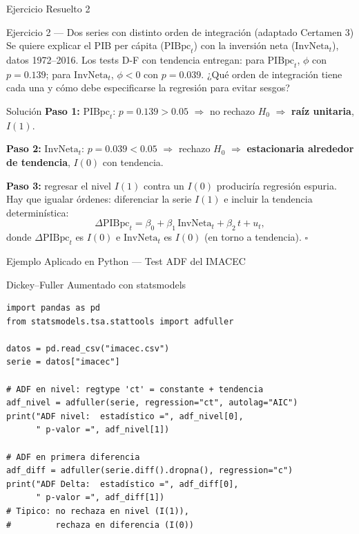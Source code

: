 \documentclass{beamer}
\begin{document}
\begin{frame}{Ejercicio Resuelto 2}

\begin{block}{Ejercicio 2 --- Dos series con distinto orden de integración (adaptado Certamen 3)}
Se quiere explicar el PIB per cápita ($\text{PIBpc}_t$) con la inversión neta ($\text{InvNeta}_t$), datos 1972--2016. Los tests D-F con tendencia entregan: para $\text{PIBpc}_t$, $\phi$ con $p=0.139$; para $\text{InvNeta}_t$, $\phi<0$ con $p=0.039$. ¿Qué orden de integración tiene cada una y cómo debe especificarse la regresión para evitar sesgos?
\end{block}

\pause

\begin{exampleblock}{Solución}
\textbf{Paso 1:} $\text{PIBpc}_t$: $p=0.139>0.05$ $\Rightarrow$ no rechazo $H_0$ $\Rightarrow$ \textbf{raíz unitaria}, $I(1)$.

\textbf{Paso 2:} $\text{InvNeta}_t$: $p=0.039<0.05$ $\Rightarrow$ rechazo $H_0$ $\Rightarrow$ \textbf{estacionaria alrededor de tendencia}, $I(0)$ con tendencia.

\textbf{Paso 3:} regresar el nivel $I(1)$ contra un $I(0)$ produciría regresión espuria. Hay que igualar órdenes: diferenciar la serie $I(1)$ e incluir la tendencia determinística:
\[
\Delta \text{PIBpc}_t = \beta_0 + \beta_1\, \text{InvNeta}_t + \beta_2\, t + u_t,
\]
donde $\Delta \text{PIBpc}_t$ es $I(0)$ e $\text{InvNeta}_t$ es $I(0)$ (en torno a tendencia). \hfill $\square$
\end{exampleblock}

\end{frame}

\begin{frame}[fragile]{Ejemplo Aplicado en Python --- Test ADF del IMACEC}

\begin{exampleblock}{Dickey--Fuller Aumentado con statsmodels}
\begin{verbatim}
import pandas as pd
from statsmodels.tsa.stattools import adfuller

datos = pd.read_csv("imacec.csv")
serie = datos["imacec"]

# ADF en nivel: regtype 'ct' = constante + tendencia
adf_nivel = adfuller(serie, regression="ct", autolag="AIC")
print("ADF nivel:  estadístico =", adf_nivel[0],
      " p-valor =", adf_nivel[1])

# ADF en primera diferencia
adf_diff = adfuller(serie.diff().dropna(), regression="c")
print("ADF Delta:  estadístico =", adf_diff[0],
      " p-valor =", adf_diff[1])
# Tipico: no rechaza en nivel (I(1)),
#         rechaza en diferencia (I(0))
\end{verbatim}
\end{exampleblock}

\end{frame}
\end{document}
